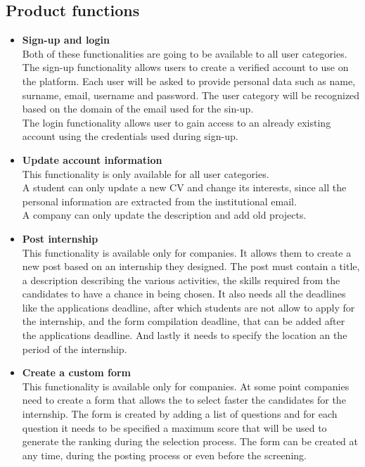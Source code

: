 \documentclass[11pt,twoside]{article}
\begin{document}
	\subsection{Product functions}
\begin{itemize}
\item \textbf{Sign-up and login} \\
Both of these functionalities are going to be available to all user categories. \\
The sign-up functionality allows users to create a verified account to use on the platform. Each user will be asked to provide personal data such as name, surname, email, username and password. The user category will be recognized based on the domain of the email used for the sin-up. \\
The login functionality allows user to gain access to an already existing account using the credentials used during sign-up.
\item \textbf{Update account information} \\
This functionality is only available for all user categories. \\
A student can only update a new CV and change its interests, since all the personal information are extracted from the institutional email. \\
A company can only update the description and add old projects.
\item \textbf{Post internship} \\
This functionality is available only for companies. It allows them to create a new post based on an internship they designed. The post must contain a title, a description describing the various activities, the skills required from the candidates to have a chance in being chosen. It also needs all the deadlines like the applications deadline, after which students are not allow to apply for the internship, and the form compilation deadline, that can be added after the applications deadline. And lastly it needs to specify the location an the period of the internship.
\item \textbf{Create a custom form} \\
This functionality is available only for companies. At some point companies need to create a form that allows the to select faster the candidates for the internship. The form is created by adding a list of questions and for each question it needs to be specified a maximum score that will be used to generate the ranking during the selection process. The form can be created at any time, during the posting process or even before the screening.

\end{itemize}
\end{document}
